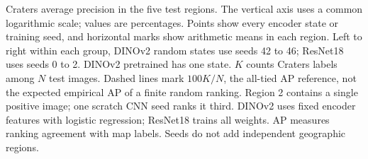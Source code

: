 \caption{Craters average precision in the five test regions. The vertical
axis uses a common logarithmic scale; values are percentages. Points show
every encoder state or training seed, and horizontal marks show arithmetic
means in each region. Left to right within each group, DINOv2 random states
use seeds 42 to 46; ResNet18 uses seeds 0 to 2. DINOv2 pretrained has one
state. $K$ counts Craters labels among $N$ test images. Dashed lines mark
$100K/N$, the all-tied AP reference, not the expected empirical AP of a finite
random ranking. Region 2 contains a single positive image; one scratch CNN
seed ranks it third. DINOv2 uses fixed encoder features with logistic
regression; ResNet18 trains all weights. AP measures ranking agreement with
map labels. Seeds do not add independent geographic regions.}
